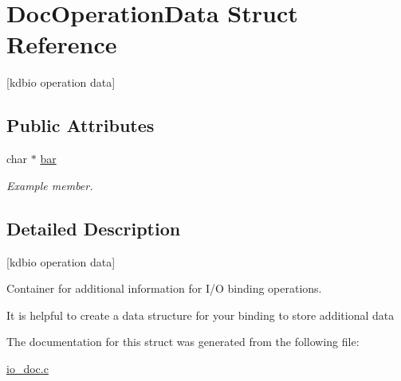 \hypertarget{structDocOperationData}{}\section{Doc\+Operation\+Data Struct Reference}
\label{structDocOperationData}


\mbox{[}kdbio operation data\mbox{]}  


\subsection*{Public Attributes}
\begin{DoxyCompactItemize}
\item 
\mbox{\label{structDocOperationData_aae15fddcc4a8c6e7a9faaebe4f9964ec}} 
char $\ast$ \hyperlink{structDocOperationData_aae15fddcc4a8c6e7a9faaebe4f9964ec}{bar}
\begin{DoxyCompactList}\small\item\em Example member. \end{DoxyCompactList}\end{DoxyCompactItemize}


\subsection{Detailed Description}
\mbox{[}kdbio operation data\mbox{]} 

Container for additional information for I/O binding operations.

It is helpful to create a data structure for your binding to store additional data 

The documentation for this struct was generated from the following file\+:\begin{DoxyCompactItemize}
\item 
\hyperlink{io__doc_8c}{io\+\_\+doc.\+c}\end{DoxyCompactItemize}
